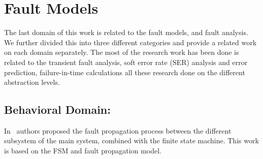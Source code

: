 


\section{Fault Models}


The last domain of this work is related to the fault models, and fault analysis. We further divided this into three different categories and provide a related work on each domain separately. The most of the research work has been done is related to the transient fault analysis, soft error rate (SER) analysis and error prediction, failure-in-time calculations all these research done on the different abstraction levels.



\subsection{Behavioral Domain:}


In~\cite{chen2017fault} authors proposed the fault propagation process between the different subsystem of the
main system, combined with the finite state machine. This work is based on the FSM and fault propagation model. 

